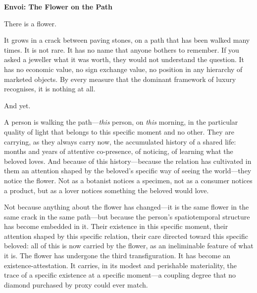 \newpage
\goldrule
\begin{center}
{\large\bfseries\color{rosedeep} Envoi: The Flower on the Path}
\end{center}
\goldrule

\vspace{0.8em}

\noindent
There is a flower.

\vspace{0.5em}

\noindent
It grows in a crack between paving stones, on a path that has been walked many times. It is not rare. It has no name that anyone bothers to remember. If you asked a jeweller what it was worth, they would not understand the question. It has no economic value, no sign exchange value, no position in any hierarchy of marketed objects. By every measure that the dominant framework of luxury recognises, it is nothing at all.

\vspace{0.5em}

\noindent
And yet.

\vspace{0.5em}

\noindent
A person is walking the path---\emph{this} person, on \emph{this} morning, in the particular quality of light that belongs to this specific moment and no other. They are carrying, as they always carry now, the accumulated history of a shared life: months and years of attentive co-presence, of noticing, of learning what the beloved loves. And because of this history---because the relation has cultivated in them an attention shaped by the beloved's specific way of seeing the world---they notice the flower. Not as a botanist notices a specimen, not as a consumer notices a product, but as a lover notices something the beloved would love.

\vspace{0.5em}

\noindent
{}

\vspace{0.5em}

\noindent
Not because anything about the flower has changed---it is the same flower in the same crack in the same path---but because the person's spatiotemporal structure has become embedded in it. Their existence in this specific moment, their attention shaped by this specific relation, their care directed toward this specific beloved: all of this is now carried by the flower, as an ineliminable feature of what it is. The flower has undergone the third transfiguration. It has become an existence-attestation. It carries, in its modest and perishable materiality, the trace of a specific existence at a specific moment---a coupling degree that no diamond purchased by proxy could ever match.

